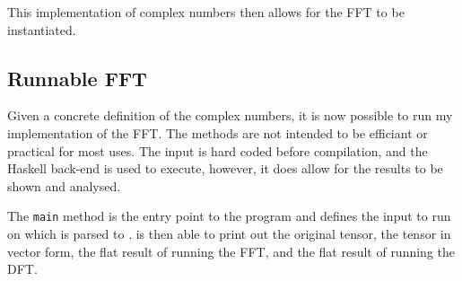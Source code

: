 This implementation of complex numbers then allows for the FFT to be
instantiated. 

\subsection{Runnable FFT}

Given a concrete definition of the complex numbers, it is now possible to run 
my implementation of the FFT.
The methods are not intended to be efficiant or practical for most uses.
The input is hard coded before compilation, and the Haskell back-end is used to
execute, however, it does allow for the results to be shown and analysed.

The \verb|main| method is the entry point to the program and defines the input 
to run on which is parsed to .
 is then able to print out 
the original tensor, the tensor in vector form, the flat
result of running the FFT, and the flat result of running the DFT.

